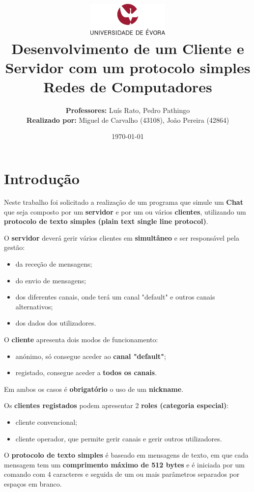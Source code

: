 \documentclass[11pt]{article}   %
\title
{
    \includegraphics[width=0.3\textwidth]{images/logo_universidade.png}
    \\[0.1cm]
    \textbf{Desenvolvimento de um Cliente e Servidor com um protocolo simples} \\
    Redes de Computadores
}
\author
{
    \textbf{Professores:} Luís Rato, Pedro Pathingo \\
    \textbf{Realizado por:} Miguel de Carvalho (43108), João Pereira (42864) 
}
\date{\today}
\begin{document}
\maketitle

\section{Introdução} 

\hspace{0,5cm}Neste trabalho foi solicitado a realização de um programa que simule um \textbf{Chat} 
que seja composto por um \textbf{servidor} e por um ou vários \textbf{clientes}, utilizando um 
\textbf{protocolo de texto simples (plain text single line protocol)}.

O \textbf{servidor} deverá gerir vários clientes em \textbf{simultâneo} e ser responsável pela gestão:
\begin{itemize}
    \item da receção de mensagens;
    \item do envio de mensagens;
    \item dos diferentes canais, onde terá um canal "default" e outros canais alternativos;
    \item dos dados dos utilizadores.
\end{itemize}

O \textbf{cliente} apresenta dois modos de funcionamento:
\begin{itemize}
    \item anónimo, só consegue aceder ao \textbf{canal "default"};
    \item registado, consegue aceder a \textbf{todos os canais}.
\end{itemize}
\hspace{0,5cm}Em ambos os casos é \textbf{obrigatório} o uso de um \textbf{nickname}.

Os \textbf{clientes registados} podem apresentar 2 \textbf{roles (categoria especial)}:
\begin{itemize}
    \item cliente convencional;
    \item cliente operador, que permite gerir canais e gerir outros utilizadores.
\end{itemize}

O \textbf{protocolo de texto simples} é baseado em mensagens de texto, em que cada mensagem
tem um \textbf{comprimento máximo de 512 bytes} e é iniciada por um comando com 4 caracteres
e seguida de um ou mais parâmetros separados por espaços em branco.
\end{document}
